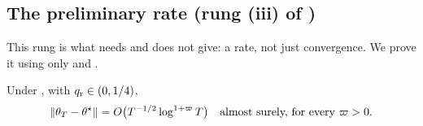 \subsection{The preliminary rate (rung (iii) of \texorpdfstring{}{the ladder})}
\label{app:prelim}

This rung is what  needs and  does not give: a rate, not just
convergence. We prove it using only  and .

\begin{lemma}
\label{lem:prelim}
Under , with $q_{\mathrm r}\in(0,1/4)$,
\[
\lVert \theta_T-\theta^\star \rVert=O\big(T^{-1/2}\log^{1+\varpi}T\big)
\quad\text{almost surely, for every }\varpi>0.
\]
\end{lemma}


